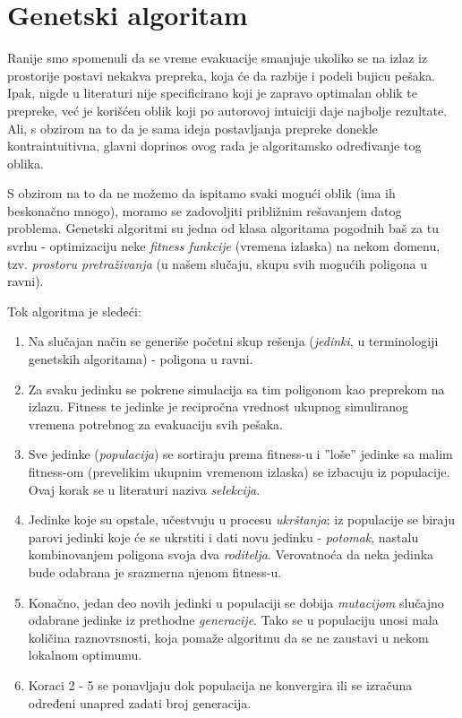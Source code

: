 \documentclass[12pt]{article}
\begin{document}
    \label{fenomeni}

\section{Genetski algoritam}\label{GA}

Ranije smo spomenuli da se vreme evakuacije smanjuje ukoliko se na izlaz iz prostorije postavi nekakva prepreka, koja će da razbije i podeli bujicu pešaka. Ipak, nigde u literaturi nije specificirano koji je zapravo optimalan oblik te prepreke, već je korišćen oblik koji po autorovoj intuiciji daje najbolje rezultate. Ali, s obzirom na to da je sama ideja postavljanja prepreke donekle kontraintuitivna, glavni doprinos ovog rada je algoritamsko određivanje tog oblika.

S obzirom na to da ne možemo da ispitamo svaki mogući oblik (ima ih beskonačno mnogo), moramo se zadovoljiti približnim rešavanjem datog problema. Genetski algoritmi su jedna od klasa algoritama pogodnih baš za tu svrhu - optimizaciju neke \emph{fitness funkcije} (vremena izlaska) na nekom domenu, tzv. \emph{prostoru pretraživanja} (u našem slučaju, skupu svih mogućih poligona u ravni).

Tok algoritma je sledeći:
\begin{enumerate}
\item Na slučajan način se generiše početni skup rešenja (\emph{jedinki}, u terminologiji genetskih algoritama) - poligona u ravni.
\item Za svaku jedinku se pokrene simulacija sa tim poligonom kao preprekom na izlazu. Fitness te jedinke je recipročna vrednost ukupnog simuliranog vremena potrebnog za evakuaciju svih pešaka.
\item Sve jedinke (\emph{populacija}) se sortiraju prema fitness-u i ''loše'' jedinke sa malim fitness-om (prevelikim ukupnim vremenom izlaska) se izbacuju iz populacije. Ovaj korak se u literaturi naziva \emph{selekcija}.
\item Jedinke koje su opstale, učestvuju u procesu \emph{ukrštanja}: iz populacije se biraju parovi jedinki koje će se ukrstiti i dati novu jedinku - \emph{potomak}, nastalu kombinovanjem poligona svoja dva \emph{roditelja}. Verovatnoća da neka jedinka bude odabrana je srazmerna njenom fitness-u.
\item Konačno, jedan deo novih jedinki u populaciji se dobija \emph{mutacijom} slučajno odabrane jedinke iz prethodne \emph{generacije}. Tako se u populaciju unosi mala količina raznovrsnosti, koja pomaže algoritmu da se ne zaustavi u nekom lokalnom optimumu.
\item Koraci 2 - 5 se ponavljaju dok populacija ne konvergira ili se izračuna određeni unapred zadati broj generacija.
\end{enumerate}
\end{document}

